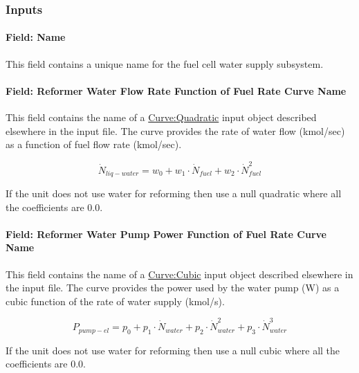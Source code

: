 \subsubsection{Inputs}\label{inputs-15-003}

\paragraph{Field: Name}\label{field-name-17-000}

This field contains a unique name for the fuel cell water supply subsystem.

\paragraph{Field: Reformer Water Flow Rate Function of Fuel Rate Curve Name}\label{field-reformer-water-flow-rate-function-of-fuel-rate-curve-name}

This field contains the name of a \hyperref[curvequadratic]{Curve:Quadratic} input object described elsewhere in the input file. The curve provides the rate of water flow (kmol/sec) as a function of fuel flow rate (kmol/sec).

\begin{equation}
{\dot N_{liq - water}} = {w_0} + {w_1} \cdot {\dot N_{fuel}} + {w_2} \cdot \dot N_{fuel}^2
\end{equation}

If the unit does not use water for reforming then use a null quadratic where all the coefficients are 0.0.

\paragraph{Field: Reformer Water Pump Power Function of Fuel Rate Curve Name}\label{field-reformer-water-pump-power-function-of-fuel-rate-curve-name}

This field contains the name of a \hyperref[curvecubic]{Curve:Cubic} input object described elsewhere in the input file. The curve provides the power used by the water pump (W) as a cubic function of the rate of water supply (kmol/s).

\begin{equation}
{P_{pump - el}} = {p_0} + {p_1} \cdot {\dot N_{water}} + {p_2} \cdot \dot N_{water}^2 + {p_3} \cdot \dot N_{water}^3
\end{equation}

If the unit does not use water for reforming then use a null cubic where all the coefficients are 0.0.

